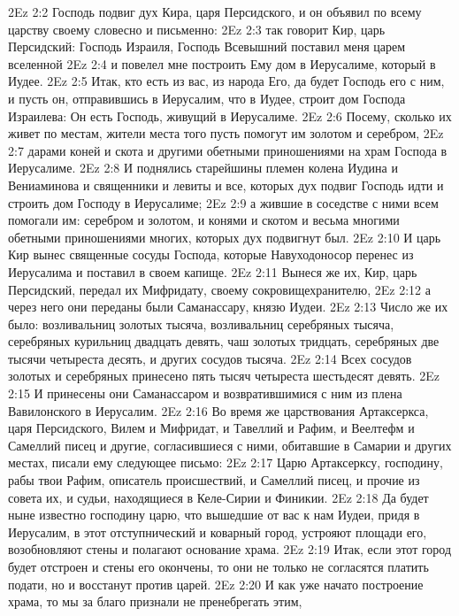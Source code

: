 \vs 2Ez 2:2 Господь подвиг дух Кира, царя Персидского, и он объявил по всему царству своему словесно и письменно:
\vs 2Ez 2:3 так говорит Кир, царь Персидский: Господь Израиля, Господь Всевышний поставил меня царем вселенной
\vs 2Ez 2:4 и повелел мне построить Ему дом в Иерусалиме, который в Иудее.
\vs 2Ez 2:5 Итак, кто есть из вас, из народа Его, да будет Господь его с ним, и пусть он, отправившись в Иерусалим, что в Иудее, строит дом Господа Израилева: Он есть Господь, живущий в Иерусалиме.
\vs 2Ez 2:6 Посему, сколько их живет по местам, жители места того пусть помогут им золотом и серебром,
\vs 2Ez 2:7 дарами коней и скота и другими обетными приношениями на храм Господа в Иерусалиме.
\rsbpar\vs 2Ez 2:8 И поднялись старейшины племен колена Иудина и Вениаминова и священники и левиты и все, которых дух подвиг Господь идти и строить дом Господу в Иерусалиме;
\vs 2Ez 2:9 а жившие в соседстве с ними всем помогали им: серебром и золотом, и конями и скотом и весьма многими обетными приношениями многих, которых дух подвигнут был.
\rsbpar\vs 2Ez 2:10 И царь Кир вынес священные сосуды Господа, которые Навуходоносор перенес из Иерусалима и поставил в своем капище.
\vs 2Ez 2:11 Вынеся же их, Кир, царь Персидский, передал их Мифридату, своему сокровищехранителю,
\vs 2Ez 2:12 а через него они переданы были Саманассару, князю Иудеи.
\vs 2Ez 2:13 Число же их было: возливальниц золотых тысяча, возливальниц серебряных тысяча, серебряных курильниц двадцать девять, чаш золотых тридцать, серебряных две тысячи четыреста десять, и других сосудов тысяча.
\vs 2Ez 2:14 Всех сосудов золотых и серебряных принесено пять тысяч четыреста шестьдесят девять.
\vs 2Ez 2:15 И принесены они Саманассаром и возвратившимися с ним из плена Вавилонского в Иерусалим.
\rsbpar\vs 2Ez 2:16 Во время же царствования Артаксеркса, царя Персидского, Вилем и Мифридат, и Тавеллий и Рафим, и Веелтефм и Самеллий писец и другие, согласившиеся с ними, обитавшие в Самарии и других местах, писали ему следующее письмо:
\vs 2Ez 2:17 Царю Артаксерксу, господину, рабы твои Рафим, описатель происшествий, и Самеллий писец, и прочие из совета их, и судьи, находящиеся в Келе-Сирии и Финикии.
\vs 2Ez 2:18 Да будет ныне известно господину царю, что вышедшие от вас к нам Иудеи, придя в Иерусалим, в этот отступнический и коварный город, устрояют площади его, возобновляют стены и полагают основание храма.
\vs 2Ez 2:19 Итак, если этот город будет отстроен и стены его окончены, то они не только не согласятся платить подати, но и восстанут против царей.
\vs 2Ez 2:20 И как уже начато построение храма, то мы за благо признали не пренебрегать этим,
